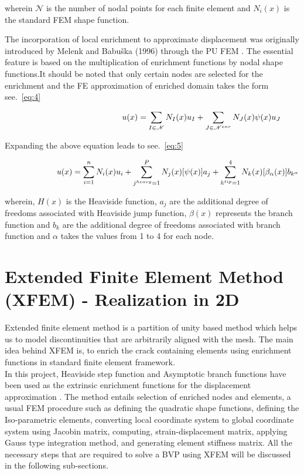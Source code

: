 \documentclass[fleqn, 12.5pt,a4paper]{report}
\begin{document}
wherein ${\mathscr{N}}$ is the number of nodal points for each finite element and $N_i(x)$ is the standard FEM shape function.

The incorporation of local enrichment to approximate displacement was originally introduced by Melenk and Babuška (1996) through the PU FEM \cite{ahmed2009extended}. The essential feature is based on the multiplication of enrichment functions by nodal shape functions\cite{ahmed2009extended}.It should be noted that only certain nodes are selected for the enrichment and the FE approximation of enriched domain takes the form see.~\autoref{eq:4}

\begin{align}\label{eq:4}
\hspace{4.25cm}u(x) = \sum_{I\in \mathscr{N}} N_I(x) u_I + \sum_{J\in \mathscr{N}^{enr}} N_J(x)\psi(x) u_J 
\end{align} 

Expanding the above equation leads to see.~\autoref{eq:5}

\begin{align}\label{eq:5}
\hspace{2.25cm}u(x) = \sum_{i=1}^n N_i(x) u_i + \sum_{j^{heavy}=1}^P N_j(x)[\psi(x)] a_j + \sum_{k^{tip}=1}^4 N_k(x)[\beta_{\alpha}(x)] b_{k^\alpha}
\end{align}

wherein, $H(x)$ is the Heaviside function, $a_j$ are the additional degree of freedoms
associated with Heaviside jump function, $\beta(x)$ represents the branch function and $b_k$ are the additional degree of freedoms associated with branch function and $\alpha$ takes the values from 1 to 4 for each node\cite{khoei2014extended}.

\section{\large{Extended Finite Element Method (XFEM) - Realization in 2D}}
Extended finite element method is a partition of unity based method which helps us to model discontinuities that are arbitrarily aligned with the mesh. The main idea behind XFEM is, to enrich the crack containing elements using enrichment functions in standard finite element framework\cite{ahmed2009extended}.\\
\hspace{-0.25cm}
In this project, Heaviside step function and Asymptotic branch functions have been used as the extrinsic enrichment functions for the displacement approximation\cite{ahmed2009extended} . The method entails selection of enriched nodes and elements, a usual FEM procedure such as defining the quadratic shape functions, defining the Iso-parametric elements, converting local coordinate system to global coordinate system using Jacobin matrix, computing, strain-displacement matrix, applying Gauss type integration method, and generating element stiffness matrix. All the necessary steps that are required to solve a BVP using XFEM will be discussed in the following sub-sections.
\end{document}
